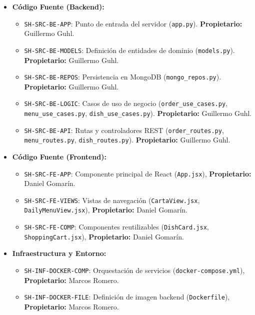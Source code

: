 \documentclass[11pt,a4paper]{article}
\begin{document}
\begin{itemize}
    \item \textbf{Código Fuente (Backend):}
        \begin{itemize}
            \item \texttt{SH-SRC-BE-APP}: Punto de entrada del servidor (\texttt{app.py}). \textbf{Propietario:} Guillermo Guhl.
            \item \texttt{SH-SRC-BE-MODELS}: Definición de entidades de dominio (\texttt{models.py}). \textbf{Propietario:} Guillermo Guhl.
            \item \texttt{SH-SRC-BE-REPOS}: Persistencia en MongoDB (\texttt{mongo\_repos.py}). \textbf{Propietario:} Guillermo Guhl.
            \item \texttt{SH-SRC-BE-LOGIC}: Casos de uso de negocio (\texttt{order\_use\_cases.py}, \texttt{menu\_use\_cases.py}, \texttt{dish\_use\_cases.py}). \textbf{Propietario:} Guillermo Guhl.
            \item \texttt{SH-SRC-BE-API}: Rutas y controladores REST (\texttt{order\_routes.py}, \texttt{menu\_routes.py}, \texttt{dish\_routes.py}). \textbf{Propietario:} Guillermo Guhl.
        \end{itemize}
        
    \item \textbf{Código Fuente (Frontend):}
        \begin{itemize}
            \item \texttt{SH-SRC-FE-APP}: Componente principal de React (\texttt{App.jsx}), \textbf{Propietario:} Daniel Gomarín.
            \item \texttt{SH-SRC-FE-VIEWS}: Vistas de navegación (\texttt{CartaView.jsx}, \texttt{DailyMenuView.jsx}), \textbf{Propietario:} Daniel Gomarín.
            \item \texttt{SH-SRC-FE-COMP}: Componentes reutilizables (\texttt{DishCard.jsx}, \texttt{ShoppingCart.jsx}), \textbf{Propietario:} Daniel Gomarín.
        \end{itemize}

    \item \textbf{Infraestructura y Entorno:} 
        \begin{itemize}
            \item \texttt{SH-INF-DOCKER-COMP}: Orquestación de servicios (\texttt{docker-compose.yml}), \textbf{Propietario:} Marcos Romero.
            \item \texttt{SH-INF-DOCKER-FILE}: Definición de imagen backend (\texttt{Dockerfile}), \textbf{Propietario:} Marcos Romero.
        \end{itemize}


\end{itemize}
\end{document}
